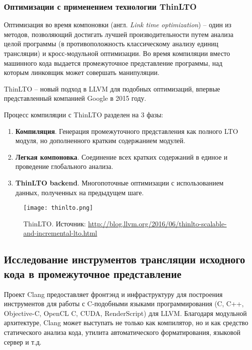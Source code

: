 \subsubsection{Оптимизации с применением технологии ThinLTO}
Оптимизация во время компоновки (англ. \textit{Link time optimization}) -- один
из методов, позволяющий достигать лучшей производительности путем анализа целой
программы (в противоположность классическому анализу единиц трансляции) и
кросс-модульной оптимизации. Во время компиляции вместо машинного кода выдается
промежуточное представление программы, над которым линковщик может совершать
манипуляции.

ThinLTO -- новый подход в LLVM для подобных оптимизаций, впервые представленный
компанией Google в 2015 году\cite{Johnson}.

Процесс компиляции с ThinLTO разделен на 3 фазы:
\begin{enumerate}
  \item \textbf{Компиляция}. Генерация промежуточного представления как полного
        LTO модуля, но дополненного кратким содержанием модулей.
  \item \textbf{Легкая компоновка}. Соединение всех кратких содержаний в единое
        и проведение глобального анализа.
  \item \textbf{ThinLTO backend}. Многопоточные оптимизации с использованием
        данных, полученных на предыдущем шаге.
\end{enumerate}
\begin{figure}[h]
  \centering
  \texttt{[image: thinlto.png]}
  \caption{ThinLTO. Источник: \url{http://blog.llvm.org/2016/06/thinlto-scalable-and-incremental-lto.html}}
\end{figure}

\subsection{Исследование инструментов трансляции исходного кода в промежуточное представление}
Проект Clang предоставляет фронтэнд и инфраструктуру для построения инструментов
для работы с C-подобными языками программирования (C, C++, Objective-C,
OpenCL C, CUDA, RenderScript) для LLVM. Благодаря модульной архитектуре, Clang
может выступать не только как компилятор, но и как средство статического анализа
кода, утилита автоматического форматирования, языковой сервер и т.д.

